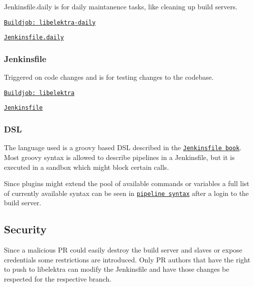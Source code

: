 \begin{DoxyItemize}
\item Jenkinsfile.\+daily is for daily maintanence tasks, like cleaning up build servers.
\item \href{https://build.libelektra.org/jenkins/job/libelektra-daily/}{\tt Buildjob\+: libelektra-\/daily}
\item \href{https://master.libelektra.org/scripts/jenkins/Jenkinsfile.daily}{\tt Jenkinsfile.\+daily}
\end{DoxyItemize}

\subsubsection*{Jenkinsfile}


\begin{DoxyItemize}
\item Triggered on code changes and is for testing changes to the codebase.
\item \href{https://build.libelektra.org/jenkins/job/libelektra/}{\tt Buildjob\+: libelektra}
\item \href{https://master.libelektra.org/scripts/jenkins/Jenkinsfile}{\tt Jenkinsfile}
\end{DoxyItemize}

\subsubsection*{D\+SL}

The language used is a groovy based D\+SL described in the \href{https://jenkins.io/doc/book/pipeline/jenkinsfile/}{\tt Jenkinsfile book}. Most groovy syntax is allowed to describe pipelines in a Jenkinsfile, but it is executed in a sandbox which might block certain calls.

Since plugins might extend the pool of available commands or variables a full list of currently available syntax can be seen in \href{https://build.libelektra.org/jenkins/job/libelektra/pipeline-syntax/}{\tt pipeline syntax} after a login to the build server.

\subsection*{Security}

Since a malicious PR could easily destroy the build server and slaves or expose credentials some restrictions are introduced. Only PR authors that have the right to push to libelektra can modify the Jenkinsfile and have those changes be respected for the respective branch.

